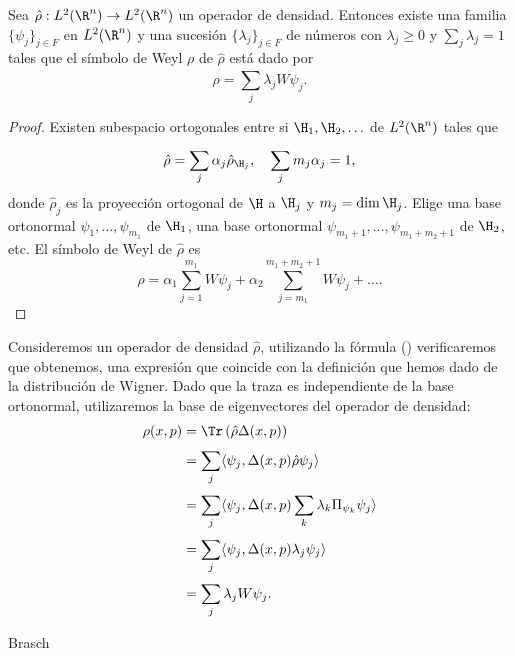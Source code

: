   \begin{proposition}
    Sea $\hat{\rho} : L^2(\R^{n}) \to L^2(\R^{n})$ un
    operador de densidad. Entonces existe una familia
    $\{\psi_j\}_{j \in F}$ en $L^2(\R^{n})$ y una sucesión
    $\{\lambda_j\}_{j \in F}$ de números con $\lambda_j \geq
    0$ y $\sum_{j}^{} \lambda_j = 1$ tales que el símbolo de
    Weyl $\rho$ de $\hat{\rho}$ está dado por
    \[
      \rho 
      = \sum_{j}^{} \lambda_j W\psi_j.
    \] 
  \end{proposition}
  \begin{proof}
    Existen subespacio ortogonales entre si $\H_1,
    \H_2,\ldots$ de $L^2(\R^{n})$ tales que
    \[
      \hat{\rho}
      = \sum_{j}^{} \alpha_j \hat{\rho}_{\H_j},
      \quad 
      \sum_{j}^{} m_j \alpha_j = 1,
    \] 
    donde $\hat{\rho}_j$ es la proyección ortogonal de $\H$ 
    a $\H_j$ y $m_j = \dim \H_j$. Elige una base ortonormal
    $\psi_1,\ldots,\psi_{m_1}$ de $\H_1$, una base
    ortonormal $\psi_{m_1+1},\ldots,\psi_{m_1+m_2+1}$ de
    $\H_2$, etc. El símbolo de Weyl de $\hat{\rho}$ es
    \[
      \rho
      = \alpha_1 \sum_{j=1}^{m_1} W\psi_j
      + \alpha_2 \sum_{j=m_1}^{m_1+m_2+1} W\psi_j + \ldots.
    \] 
  \end{proof}

Consideremos un operador de densidad $\hat{\rho}$,
  utilizando la fórmula () verificaremos que obtenemos, una
  expresión que coincide con la definición que hemos dado de
  la distribución de Wigner. Dado que la traza es
  independiente de la base ortonormal, utilizaremos la base
  de eigenvectores del operador de densidad:
  \begin{align*}
    \rho(x,p) &= \Tr\left( \hat{\rho} \Delta(x,p) \right) \\
              &= \sum_{j}^{} \langle \psi_j, 
              \Delta(x,p) \hat{\rho} \psi_j \rangle \\
              &= \sum_{j}^{} \langle \psi_j, \Delta(x,p)
              \sum_{k}^{} \lambda_k \Pi_{\psi_k} \psi_j
              \rangle \\
              &= \sum_{j}^{} \langle \psi_j, \Delta(x,p)
              \lambda_j \psi_j \rangle \\
              &= \sum_{j}^{} \lambda_j W\psi_j.
  \end{align*}

  Brasch

